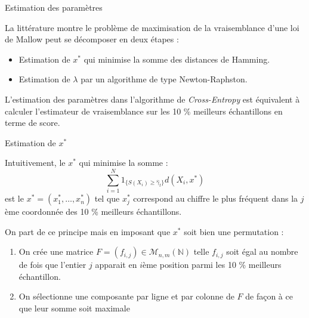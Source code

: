 \documentclass[10pt,xcolor=table,color={dvipsnames,usenames},ignorenonframetext,usepdftitle=false,french]{beamer}
\begin{document}
\begin{frame}{Estimation des paramètres}

La littérature montre le problème de maximisation de la vraisemblance
d'une loi de Mallow peut se décomposer en deux étapes :

\begin{itemize}
\item Estimation de $x^*$ qui minimise la somme des distances de Hamming.
\item Estimation de $\lambda$ par un algorithme de type Newton-Raphston.
\end{itemize}

L'estimation des paramètres dans l'algorithme de \emph{Cross-Entropy}
est équivalent à calculer l'estimateur de vraisemblance sur les 10 \%
meilleurs échantillons en terme de score.

\end{frame}

\begin{frame}{Estimation de \(x^*\)}

Intuitivement, le \(x^*\) qui minimise la somme :
\[\sum_{i=1}^N 1_{\{S(X_{i})\geq\hat{\gamma}_{t}\}}d(X_i,x^*)\] est le
\(x^*=(x_1^*,\dots,x_n^*)\) tel que \(x_j^*\) correspond au chiffre le
plus fréquent dans la \(j\)ème coordonnée des 10 \% meilleurs
échantillons.

On part de ce principe mais en imposant que \(x^*\) soit bien une
permutation :

\begin{enumerate}
\def\labelenumi{\arabic{enumi}.}
\item
  On crée une matrice \(F=(f_{i,j})\in\mathcal M_{n,m}(\mathbb{N})\)
  telle \(f_{i,j}\) soit égal au nombre de fois que l'entier \(j\)
  apparait en \(i\)ème position parmi les 10 \% meilleurs échantillon.
\item
  On sélectionne une composante par ligne et par colonne de \(F\) de
  façon à ce que leur somme soit maximale
\end{enumerate}

\end{frame}
\end{document}

